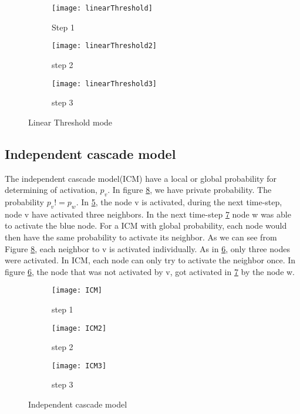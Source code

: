 {\begin{figure}[!ht]
	\begin{subfigure}{0.3\textwidth}
		\texttt{[image: linearThreshold]}
		\caption{Step 1 } 
		\label{fig:linearThresh}
	\end{subfigure}
	\begin{subfigure}{0.3\textwidth}
		\texttt{[image: linearThreshold2]}
		\caption{step 2 } 
		\label{fig:linearThresh2}
	\end{subfigure}
	\begin{subfigure}{0.3\textwidth}
		\texttt{[image: linearThreshold3]}
		\caption{step 3} 
		\label{fig:linearThresh3}
	\end{subfigure}
	\caption{Linear Threshold mode}
\end{figure}

\subsection{Independent cascade model}
The independent cascade model(ICM) have a local or global probability for determining of activation, $p_v$. In figure \ref{fig:ICM_step}, we have private probability. The probability $p_v != p_w$. In \ref{fig:ICM}, the node v is activated, during the next time-step, node v have activated three neighbors. In the next time-step \ref{fig:ICM3} node w was able to activate the blue node. For a ICM with global probability, each node would then have the same probability to activate its neighbor. As we can see from Figure \ref{fig:ICM_step}, each neighbor to v is activated individually. As in \ref{fig:ICM2}, only three nodes were activated. In ICM, each node can only try to activate the neighbor once. In figure \ref{fig:ICM2}, the node that was not activated by v, got activated in \ref{fig:ICM3} by the node w.


\begin{figure}[!ht]
	\begin{subfigure}{0.3\textwidth}
		\texttt{[image: ICM]}
		\caption{step 1 } 
		\label{fig:ICM}
	\end{subfigure}
	\begin{subfigure}{0.3\textwidth}
		\texttt{[image: ICM2]}
		\caption{step 2} 
		\label{fig:ICM2}
	\end{subfigure}
	\begin{subfigure}{0.3\textwidth}
		\texttt{[image: ICM3]}
		\caption{step 3} 
		\label{fig:ICM3}
	\end{subfigure}
	\caption{Independent cascade model}
	\label{fig:ICM_step}
\end{figure}

}
